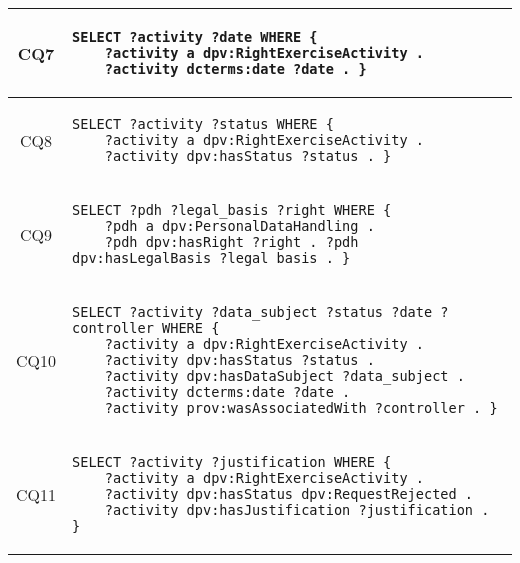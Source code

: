 \begin{table}[htp]
\begin{tabular}{c|l}
        \hline
        CQ7 & \begin{lstlisting}[numbers=none]
SELECT ?activity ?date WHERE {
    ?activity a dpv:RightExerciseActivity . 
    ?activity dcterms:date ?date . } \end{lstlisting} \\
        \hline
        CQ8 & \begin{lstlisting}[numbers=none]
SELECT ?activity ?status WHERE {
    ?activity a dpv:RightExerciseActivity . 
    ?activity dpv:hasStatus ?status . } \end{lstlisting} \\
        \hline
        CQ9 & \begin{lstlisting}[numbers=none]
SELECT ?pdh ?legal_basis ?right WHERE {
    ?pdh a dpv:PersonalDataHandling . 
    ?pdh dpv:hasRight ?right . ?pdh dpv:hasLegalBasis ?legal_basis . } \end{lstlisting} \\
        \hline
        CQ10 & \begin{lstlisting}[numbers=none]
SELECT ?activity ?data_subject ?status ?date ?controller WHERE {
    ?activity a dpv:RightExerciseActivity . 
    ?activity dpv:hasStatus ?status . 
    ?activity dpv:hasDataSubject ?data_subject . 
    ?activity dcterms:date ?date . 
    ?activity prov:wasAssociatedWith ?controller . } \end{lstlisting} \\
        \hline
        CQ11 & \begin{lstlisting}[numbers=none]
SELECT ?activity ?justification WHERE {
    ?activity a dpv:RightExerciseActivity . 
    ?activity dpv:hasStatus dpv:RequestRejected . 
    ?activity dpv:hasJustification ?justification . } \end{lstlisting} \\
    \end{tabular}
\end{table}